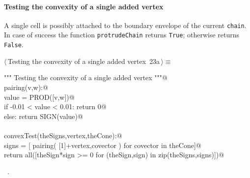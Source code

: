 \documentclass[11pt,oneside]{article}	%
\begin{document}
\paragraph{Testing the convexity of a single added vertex}
A single cell is possibly attached to the boundary envelope of the current \texttt{chain}. In case of success
the function \texttt{protrudeChain} returns \texttt{True}; otherwise returns \texttt{False}. 
\begin{flushleft} \small \label{scrap28}
\protect{}$\langle\,$Testing the convexity of a single added vertex\nobreak\ {\footnotesize 23a}$\,\rangle\equiv$
\vspace{-1ex}
\begin{list}{}{} \item
\mbox{}\verb@""" Testing the convexity of a single added vertex """@\\
\mbox{}\verb@def pairing(v,w):@\\
\mbox{}\verb@   value = PROD([v,w])@\\
\mbox{}\verb@   if -0.01 < value < 0.01: return 0@\\
\mbox{}\verb@   else: return SIGN(value)@\\
\mbox{}\verb@@\\
\mbox{}\verb@def convexTest(theSigns,vertex,theCone):@\\
\mbox{}\verb@   signs = [ pairing( [1]+vertex,covector ) for covector in theCone]@\\
\mbox{}\verb@   return all([theSign*sign >= 0 for (theSign,sign) in zip(theSigns,signs)])@\\
\mbox{}\verb@@{\NWsep}
\end{list}
\vspace{-1ex}
\footnotesize\addtolength{\baselineskip}{-1ex}
\begin{list}{}{\setlength{\itemsep}{-\parsep}\setlength{\itemindent}{-\leftmargin}}
\item \NWtxtMacroRefIn\ .
\end{list}
\end{flushleft}
\end{document}
